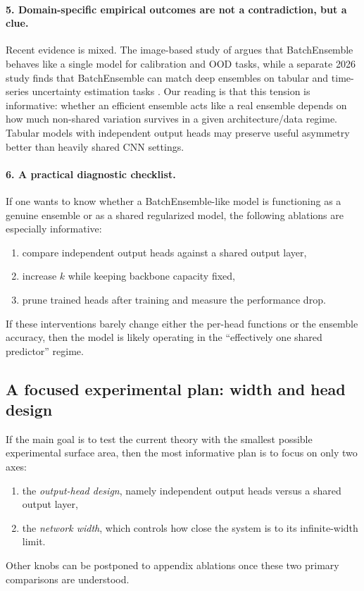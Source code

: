 \documentclass[11pt]{article}
\theoremstyle{definition}
\begin{document}
\paragraph{5. Domain-specific empirical outcomes are not a contradiction, but a clue.}
Recent evidence is mixed.
The image-based study of \cite{zamyatin2026} argues that BatchEnsemble behaves like a single model for calibration and OOD tasks,
while a separate 2026 study finds that BatchEnsemble can match deep ensembles on tabular and time-series uncertainty estimation tasks \cite{blorstad2026}.
Our reading is that this tension is informative:
whether an efficient ensemble acts like a real ensemble depends on how much non-shared variation survives in a given architecture/data regime.
Tabular models with independent output heads may preserve useful asymmetry better than heavily shared CNN settings.

\paragraph{6. A practical diagnostic checklist.}
If one wants to know whether a BatchEnsemble-like model is functioning as a genuine ensemble or as a shared regularized model, the following ablations are especially informative:
\begin{enumerate}[leftmargin=2em]
  \item compare independent output heads against a shared output layer,
  \item increase $k$ while keeping backbone capacity fixed,
  \item prune trained heads after training and measure the performance drop.
\end{enumerate}
If these interventions barely change either the per-head functions or the ensemble accuracy, then the model is likely operating in the ``effectively one shared predictor'' regime.

\subsection{A focused experimental plan: width and head design}

If the main goal is to test the current theory with the smallest possible experimental surface area,
then the most informative plan is to focus on only two axes:
\begin{enumerate}[leftmargin=2em]
  \item the \emph{output-head design}, namely independent output heads versus a shared output layer,
  \item the \emph{network width}, which controls how close the system is to its infinite-width limit.
\end{enumerate}
Other knobs can be postponed to appendix ablations once these two primary comparisons are understood.
\end{document}
